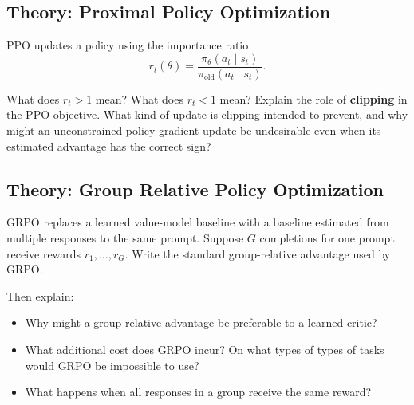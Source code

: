 \subsection{Theory: Proximal Policy Optimization}
PPO \citep{schulman2017proximal} updates a policy using the importance ratio
\[
r_t(\theta)=\frac{\pi_\theta(a_t\mid s_t)}{\pi_{\text{old}}(a_t\mid s_t)}.
\]

What does $r_t>1$ mean? What does $r_t<1$ mean?
Explain the role of \textbf{clipping} in the PPO objective.
What kind of update is clipping intended to prevent, and why might an unconstrained policy-gradient update be undesirable even when its estimated advantage has the correct sign?



\subsection{Theory: Group Relative Policy Optimization}
GRPO \citep{shao2024deepseekmath} replaces a learned value-model baseline with a baseline estimated from multiple responses to the same prompt.
Suppose $G$ completions for one prompt receive rewards $r_1,\ldots,r_G$.
Write the standard group-relative advantage used by GRPO.

Then explain:
\begin{itemize}
    \item Why might a group-relative advantage be preferable to a learned critic?
    \item What additional cost does GRPO incur? On what types of types of tasks would GRPO be impossible to use?
    \item What happens when all responses in a group receive the same reward?
\end{itemize}


